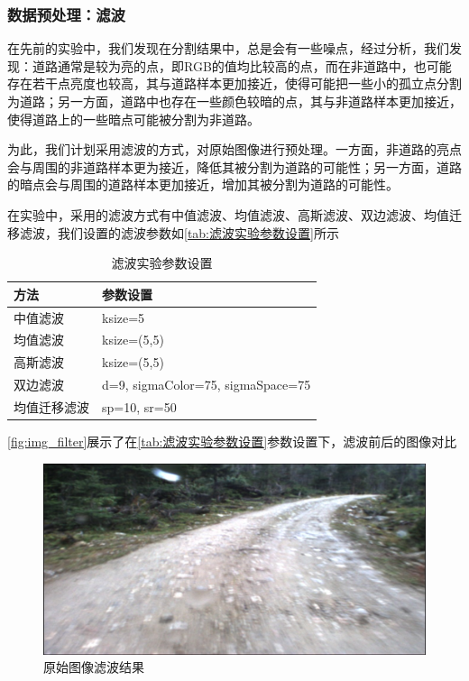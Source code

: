 \documentclass[12pt,hyperref,a4paper,UTF8]{ctexart}
\begin{document}
\subsubsection{数据预处理：滤波}
在先前的实验中，我们发现在分割结果中，总是会有一些噪点，经过分析，我们发现：道路通常是较为亮的点，即RGB的值均比较高的点，而在非道路中，也可能存在若干点亮度也较高，其与道路样本更加接近，使得可能把一些小的孤立点分割为道路；另一方面，道路中也存在一些颜色较暗的点，其与非道路样本更加接近，使得道路上的一些暗点可能被分割为非道路。
\par
为此，我们计划采用滤波的方式，对原始图像进行预处理。一方面，非道路的亮点会与周围的非道路样本更为接近，降低其被分割为道路的可能性；另一方面，道路的暗点会与周围的道路样本更加接近，增加其被分割为道路的可能性。
\par
在实验中，采用的滤波方式有中值滤波、均值滤波、高斯滤波、双边滤波、均值迁移滤波，我们设置的滤波参数如\autoref{tab:滤波实验参数设置}所示

\begin{table}[!htbp]

\caption{滤波实验参数设置}
    \centering
    \begin{tabular}{ll}
    \hline
        \textbf{方法} & \textbf{参数设置} \\
        \hline
        中值滤波  & ksize=5 \\
     	
        均值滤波 & ksize=(5,5) \\
        
        高斯滤波  & ksize=(5,5) \\
        
        双边滤波  & d=9, sigmaColor=75, sigmaSpace=75 \\
        
        均值迁移滤波  & sp=10, sr=50 \\
        \hline
    \end{tabular}
    \label{tab:滤波实验参数设置}
\end{table}

\par

\autoref{fig:img_filter}展示了在\autoref{tab:滤波实验参数设置}参数设置下，滤波前后的图像对比

\begin{figure}[htbp]
  \centering
\includegraphics[width=0.3\linewidth]{data/0618.png}
\caption{原始图像滤波结果}
\label{fig:img_filter}
\end{figure}
\end{document}
